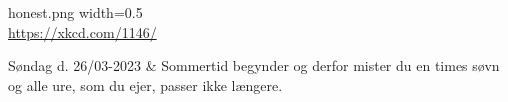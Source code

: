 \begin{kalender}
    [width=2cm,clip=true] %
    {honest.png} %
    {width=0.5\textwidth}
    {\\\url{https://xkcd.com/1146/}}
    
    \vspace{0.2cm}
    Søndag d. 26/03-2023 & Sommertid begynder og derfor mister du en times søvn og alle ure, som du ejer, passer ikke længere.
    \smallskip \\
\end{kalender}

